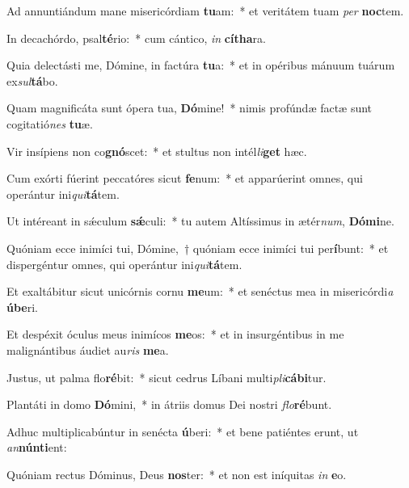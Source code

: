 \item Ad annuntiándum mane misericórdiam \textbf{tu}am:~* et veritátem tuam \textit{per} \textbf{noc}tem.
\item In decachórdo, psal\textbf{té}rio:~* cum cántico, \textit{in} \textbf{cí}\textbf{tha}ra.
\item Quia delectásti me, Dómine, in factúra \textbf{tu}a:~* et in opéribus mánuum tuárum ex\textit{sul}\textbf{tá}bo.
\item Quam magnificáta sunt ópera tua, \textbf{Dó}mine!~* nimis profúndæ factæ sunt cogitatió\textit{nes} \textbf{tu}æ.
\item Vir insípiens non co\textbf{gnó}scet:~* et stultus non intél\textit{li}\textbf{get} hæc.
\item Cum exórti fúerint peccatóres sicut \textbf{fe}num:~* et apparúerint omnes, qui operántur ini\textit{qui}\textbf{tá}tem.
\item Ut intéreant in sǽculum \textbf{sǽ}culi:~* tu autem Altíssimus in ætér\textit{num}, \textbf{Dó}\textbf{mi}ne.
\item Quóniam ecce inimíci tui, Dómine,~† quóniam ecce inimíci tui per\textbf{í}bunt:~* et dispergéntur omnes, qui operántur ini\textit{qui}\textbf{tá}tem.
\item Et exaltábitur sicut unicórnis cornu \textbf{me}um:~* et senéctus mea in misericórdi\textit{a} \textbf{ú}\textbf{be}ri.
\item Et despéxit óculus meus inimícos \textbf{me}os:~* et in insurgéntibus in me malignántibus áudiet au\textit{ris} \textbf{me}a.
\item Justus, ut palma flo\textbf{ré}bit:~* sicut cedrus Líbani multi\textit{pli}\textbf{cá}\textbf{bi}tur.
\item Plantáti in domo \textbf{Dó}mini,~* in átriis domus Dei nostri \textit{flo}\textbf{ré}bunt.
\item Adhuc multiplicabúntur in senécta \textbf{ú}beri:~* et bene patiéntes erunt, ut \textit{an}\textbf{nún}\textbf{ti}ent:
\item Quóniam rectus Dóminus, Deus \textbf{nos}ter:~* et non est iníquitas \textit{in} \textbf{e}o.
